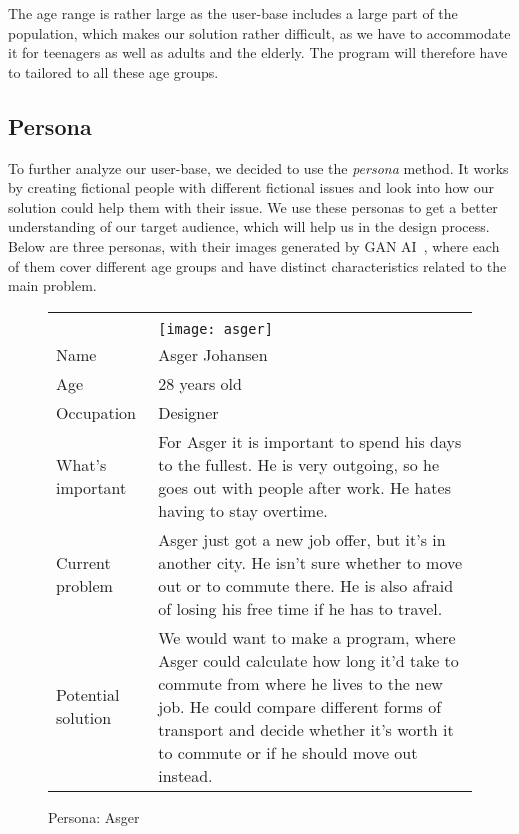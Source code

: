 The age range is rather large as the user-base includes a large part of the population, which makes our solution rather
difficult, as we have to accommodate it for teenagers as well as adults and the elderly.
The program will therefore have to tailored to all these age groups.

\subsection{Persona}\label{subsec:persona}

To further analyze our user-base, we decided to use the \textit{persona} method.
It works by creating fictional people with different fictional issues and look into how our solution could help them
with their issue.
We use these personas to get a better understanding of our target audience, which will help us in the design process.
Below are three personas, with their images generated by GAN AI~\cite{thispersondoesnotexist}, where each of them
cover different age groups and have distinct characteristics related to the main problem.

\renewcommand{\arraystretch}{1.5}

\noindent
\begin{figure}[H]
    \centering
    \begin{tabularx}{\textwidth}{ | l X | }
        \hline
        &                                               \\
        & \texttt{[image: asger]} \\
        Name       & Asger Johansen                                \\
        Age        & 28 years old                                  \\
        Occupation & Designer                                      \\
        What's important & For Asger it is important to spend his days to the fullest.
        He is very outgoing, so he goes out with people after work.
        He hates having to stay overtime. \\
        Current problem & Asger just got a new job offer, but it's in another city.
        He isn't sure whether to move out or to commute there.
        He is also afraid of losing his free time if he has to travel. \\
        Potential solution & We would want to make a program, where Asger could calculate how long it'd take to commute from
        where he lives to the new job.
        He could compare different forms of transport and decide whether it's worth it to commute or if he should move out
        instead. \\
        \hline
    \end{tabularx}
    \caption{Persona: Asger}
    \label{fig:persona_asger}
\end{figure}

